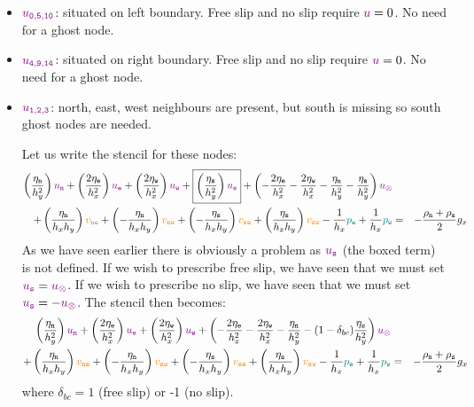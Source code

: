\begin{itemize}
\item ${\color{violet} u_{\tt 0,5,10}}$: situated on left boundary. Free slip and no slip require ${\color{violet} u}=0$. No need for a ghost node.
\item ${\color{violet} u_{\tt 4,9,14}}$: situated on right boundary. Free slip and no slip require ${\color{violet} u}=0$. No need for a ghost node.
\item ${\color{violet} u_{\tt 1,2,3}}$: north, east, west neighbours are present, but south is missing so south ghost nodes are needed.

Let us write the stencil for these nodes:
\begin{eqnarray}
\left( \frac{\eta_{\tt n}}{h_y^2} \right) {\color{violet} u_{\tt n}} + 
\left( \frac{2\eta_{\tt e}}{h_x^2} \right) {\color{violet} u_{\tt e}} + 
\left( \frac{2\eta_{\tt w}}{h_x^2} \right) {\color{violet} u_{\tt w}} + 
\boxed{\left( \frac{\eta_{\tt s}}{h_y^2} \right) {\color{violet} u_{\tt s}}} + 
\left( -\frac{2\eta_{\tt e}}{h_x^2} -\frac{2\eta_{\tt w}}{h_x^2}  
-\frac{\eta_{\tt n}}{h_y^2} -\frac{\eta_{\tt s}}{h_y^2}  
\right) {\color{violet} u_\otimes} \nonumber\\
+
\left( \frac{\eta_{\tt n}}{h_x h_y} \right) {\color{orange} v_{\tt ne}}+ 
\left(-\frac{\eta_{\tt n}}{h_x h_y} \right) {\color{orange} v_{\tt nw}}+ 
\left(-\frac{\eta_{\tt s}}{h_x h_y} \right) {\color{orange} v_{\tt se}}+ 
\left( \frac{\eta_{\tt s}}{h_x h_y} \right) {\color{orange} v_{\tt sw}} 
- \frac{1}{h_x} {\color{teal}p_{\tt e}} + \frac{1}{h_x} {\color{teal}p_{\tt w}} 
&=& -\frac{\rho_{\tt n}+\rho_{\tt s}}{2} g_x \nonumber
\end{eqnarray}
As we have seen earlier there is obviously a problem as ${\color{violet} u_{\tt s}}$ (the boxed term)
is not defined.
If we wish to prescribe free slip, we have seen that we must set 
${\color{violet} u_{\tt s}}={\color{violet} u_\otimes}$.
If we wish to prescribe no slip, we have seen that we must set 
${\color{violet} u_{\tt s}}=-{\color{violet} u_\otimes}$.
The stencil then becomes:
\begin{eqnarray}
\left( \frac{\eta_{\tt n}}{h_y^2} \right) {\color{violet} u_{\tt n}} + 
\left( \frac{2\eta_{\tt e}}{h_x^2} \right) {\color{violet} u_{\tt e}} + 
\left( \frac{2\eta_{\tt w}}{h_x^2} \right) {\color{violet} u_{\tt w}} + 
\left( -\frac{2\eta_{\tt e}}{h_x^2} -\frac{2\eta_{\tt w}}{h_x^2}  
-\frac{\eta_{\tt n}}{h_y^2} -(1-\delta_{bc})\frac{\eta_{\tt s}}{h_y^2}
\right) {\color{violet} u_\otimes} \nonumber\\
+
\left( \frac{\eta_{\tt n}}{h_x h_y} \right) {\color{orange} v_{\tt ne}}+ 
\left(-\frac{\eta_{\tt n}}{h_x h_y} \right) {\color{orange} v_{\tt nw}}+ 
\left(-\frac{\eta_{\tt s}}{h_x h_y} \right) {\color{orange} v_{\tt se}}+ 
\left( \frac{\eta_{\tt s}}{h_x h_y} \right) {\color{orange} v_{\tt sw}} 
- \frac{1}{h_x} {\color{teal}p_{\tt e}} + \frac{1}{h_x} {\color{teal}p_{\tt w}} 
&=& -\frac{\rho_{\tt n}+\rho_{\tt s}}{2} g_x \nonumber
\end{eqnarray}
where $\delta_{bc}=1$ (free slip) or -1 (no slip).




\end{itemize}
